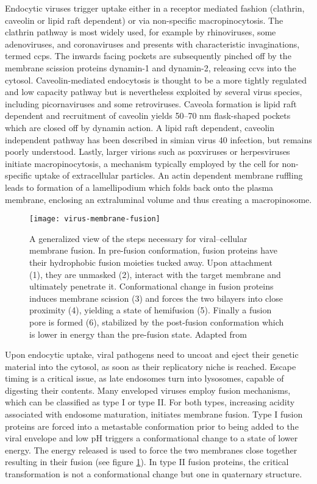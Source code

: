 Endocytic viruses trigger uptake either in a receptor mediated fashion (clathrin, caveolin or lipid raft dependent) or via non-specific macropinocytosis. The clathrin pathway is most widely used, for example by rhinoviruses, some adenoviruses, and coronaviruses and presents with characteristic invaginations, termed \glspl{ccp}. The inwards facing pockets are subsequently pinched off by the membrane scission proteins dynamin-1 and dynamin-2, releasing \glspl{ccv} into the cytosol. Caveolin-mediated endocytosis is thought to be a more tightly regulated and low capacity pathway but is nevertheless exploited by several virus species, including picornaviruses and some retroviruses. Caveola formation is lipid raft dependent and recruitment of caveolin yields 50--70 nm flask-shaped pockets which are closed off by dynamin action. A lipid raft dependent, caveolin independent pathway has been described in simian virus 40 infection, but remains poorly understood. Lastly, larger virions such as poxviruses or herpesviruses initiate macropinocytosis, a mechanism typically employed by the cell for non-specific uptake of extracellular particles. An actin dependent membrane ruffling leads to formation of a lamellipodium which folds back onto the plasma membrane, enclosing an extraluminal volume and thus creating a macropinosome.

\begin{figure}
  \centering
  \texttt{[image: virus-membrane-fusion]}
  \caption[A generalized view of the steps necessary for viral--cellular membrane fusion]{A generalized view of the steps necessary for viral--cellular membrane fusion. In pre-fusion conformation, fusion proteins have their hydrophobic fusion moieties tucked away. Upon attachment (1), they are unmasked (2), interact with the target membrane and ultimately penetrate it. Conformational change in fusion proteins induces membrane scission (3) and forces the two bilayers into close proximity (4), yielding a state of hemifusion (5). Finally a fusion pore is formed (6), stabilized by the post-fusion conformation which is lower in energy than the pre-fusion state. Adapted from \cite{Hulo2011}}
  \label{fig:virus-membrane-fusion}
\end{figure}

Upon endocytic uptake, viral pathogens need to uncoat and eject their genetic material into the cytosol, as soon as their replicatory niche is reached. Escape timing is a critical issue, as late endosomes turn into lysosomes, capable of digesting their contents. Many enveloped viruses employ fusion mechanisms, which can be classified as type I or type II. For both types, increasing acidity associated with endosome maturation, initiates membrane fusion. Type I fusion proteins are forced into a metastable conformation prior to being added to the viral envelope and low pH triggers a conformational change to a state of lower energy. The energy released is used to force the two membranes close together resulting in their fusion (see figure \ref{fig:virus-membrane-fusion}). In type II fusion proteins, the critical transformation is not a conformational change but one in quaternary structure.

